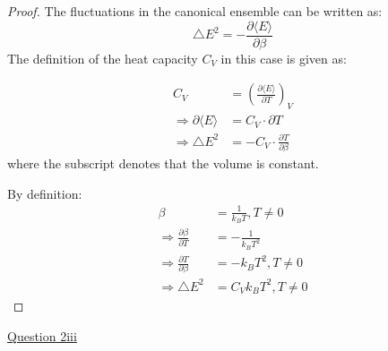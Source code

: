 \documentclass[11pt]{article}
\begin{document}
\begin{proof}
    The fluctuations in the canonical ensemble can be written as: 
    \begin{equation}
        \triangle E^2 = - \frac{\partial \langle E \rangle}{\partial \beta}
    \end{equation}
    The definition of the heat capacity $C_V$ in this case is given as: 
    
    \begin{equation}
        \begin{aligned}
            C_V &= \left(\frac{\partial \langle E \rangle}{\partial T} \right)_V \\
            \Rightarrow \partial \langle E \rangle &= C_V \cdot \partial T \\
            \Rightarrow \triangle E^2 &= - C_V \cdot \frac{\partial T}{\partial \beta}
        \end{aligned}
    \end{equation}
    where the subscript denotes that the volume is constant.

    By definition:
    \begin{equation}
            \begin{aligned}
                \beta &= \frac{1}{k_BT}, T\neq 0 \\
                \Rightarrow \frac{\partial \beta}{\partial T} &= - \frac{1}{k_BT^2} \\
                \Rightarrow \frac{\partial T}{\partial \beta} &= -k_BT^2, T\neq 0 \\
                \Rightarrow \triangle E^2 &= C_V k_B T^2, T \neq 0
            \end{aligned}
    \end{equation}
    
\end{proof}
\newpage

\underline{Question 2iii}
\end{document}
